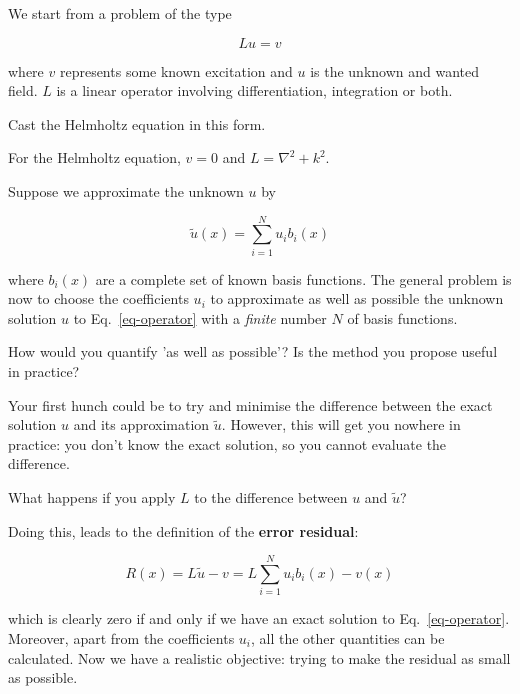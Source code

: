We start from a problem of the type

\begin{equation}
L u = v \label{eq-operator}
\end{equation}

where $v$ represents some known excitation and $u$ is the unknown and wanted field. $L$ is a linear operator involving differentiation, integration or both.

\begin{cue}
Cast the Helmholtz equation in this form.  
\end{cue}

For the Helmholtz equation, $v=0$ and $L=\nabla^2 + k^2$. 

Suppose we approximate the unknown $u$ by

\begin{equation}
\tilde{u}(x) = \sum_{i=1}^N u_i b_i(x) \label{eq-expansion}
\end{equation} 

where $b_i(x)$ are a complete set of known basis functions. The general problem is now to choose the coefficients $u_i$ to approximate as well as possible the unknown solution $u$ to Eq.~\ref{eq-operator} with a \emph{finite} number $N$ of basis functions.

\begin{cue}
How would you quantify 'as well as possible'? Is the method you propose useful in practice?  
\end{cue}

Your first hunch could be to try and minimise the difference between the exact solution $u$ and its approximation $\tilde{u}$. However, this will get you nowhere in practice: you don't know the exact solution, so you cannot evaluate the difference.

\begin{cue}
What happens if you apply $L$ to the difference between $u$ and $\tilde{u}$? 
\end{cue}

Doing this, leads to the definition of the \textbf{error residual}:

\begin{equation}
R(x) = L\tilde{u} - v = L \sum_{i=1}^N u_i b_i(x) - v(x)
\end{equation} 

which is clearly zero if and only if we have an exact solution to Eq.~\ref{eq-operator}. Moreover, apart from the coefficients $u_i$, all the other quantities can be calculated. Now we have a realistic objective: trying to make the residual as small as possible.

